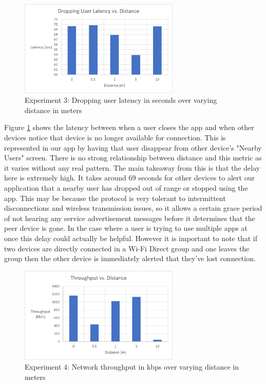\documentclass[10pt]{article}
\begin{document}
\begin{figure}[h!]
    \centering
    \includegraphics[width=3in]{dropping_user_latency_graph.png}
    \caption{Experiment 3: Dropping user latency in seconds over varying distance in meters}
    \label{results:dropping_user}
\end{figure}

Figure \ref{results:dropping_user} shows the latency between when a user closes the app and when other devices notice that device is no longer available for connection. This is represented in our app by having that user disappear from other device's "Nearby Users" screen. There is no strong relationship between distance and this metric as it varies without any real pattern. The main takeaway from this is that the delay here is extremely high. It takes around 69 seconds for other devices to alert our application that a nearby user has dropped out of range or stopped using the app. This may be because the protocol is very tolerant to intermittent disconnections and wireless transmission issues, so it allows a certain grace period of not hearing any service advertisement messages before it determines that the peer device is gone. In the case where a user is trying to use multiple apps at once this delay could actually be helpful. However it is important to note that if two devices are directly connected in a Wi-Fi Direct group and one leaves the group then the other device is immediately alerted that they've lost connection.

\begin{figure}[h!]
    \centering
    \includegraphics[width=3in]{throughput_graph.png}
    \caption{Experiment 4: Network throughput in kbps over varying distance in meters}
    \label{results:throughput}
\end{figure}
\end{document}
